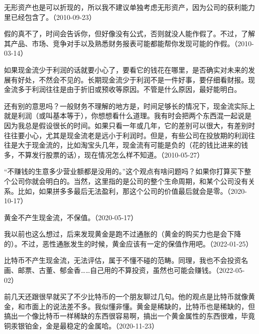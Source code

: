 
无形资产也是可以折现的，所以我不建议单独考虑无形资产，因为公司的获利能力里已经包含了。（2010-09-23）


假的真不了，时间会告诉你，但好像没有公式，否则就没人能作假了。不过，了解其产品、市场、竞争对手以及熟悉财务报表可能都能帮你发现可能的作假。（2010-03-14）


如果现金流少于利润的话就要小心了，要看它的钱花在哪里，是否确实对未来的发展有好处，不然会不见的。长期现金流少于利润不是一件好事，要仔细看财报。现金流多于利润往往是由于折旧或预收等原因。不管是什么原因，最好能明白。


还有别的意思吗？一般财务不理解的地方是，时间足够长的情况下，现金流实际上就是利润（或叫基本等于），你想想看什么道理。我有时会把两个东西混一起说是因为我总是假设很长的时间。如果只看一年或几年，它的差别可以很大，有差别时往往要小心，尤其是现金流老是远小于利润时。但是，有些公司在投放期的利润往往是大于现金流的，比如淘宝头几年，现金流有可能是负的（花的钱比进来的钱多，不算发行股票的话），现在情况怎么样不知道。（2010-05-27）


“不赚钱的生意多少营业额都是没用的。”这个观点有啥问题吗？如果你打算买下整个公司你就会明白的。当然，这里指的是公司的整个生命周期，和某个公司没有关系。比如，如果拼多多最后无法盈利，那这个公司的价值最后就会是零。（2020-10-17）

黄金不产生现金流，不保值。（2020-05-17）


我以前也这么想过，后来发现黄金是跑不过通胀的（黄金的购买力也是会下降的）。不过，恶性通胀发生的时候，黄金应该有一定的保值作用吧。（2022-01-25）

比特币不产生现金流，无法评估，属于不懂不碰的范畴。同理，我也不会投资名画、邮票、古董、郁金香……自己用的不算投资，虽然也可能会赚钱。（2022-05-02）

前几天还跟很早就买了不少比特币的一个朋友聊过几句。他的观点是比特币就像黄金，和市面上的说法差不多。我似懂非懂。黄金是稀缺的，比特币也是稀缺的，但搞出一个像比特币一样稀缺的东西很容易啊，搞出一个黄金属性的东西很难，毕竟铜汞银铂金，金是最稳定的金属哈。（2020-11-23）

